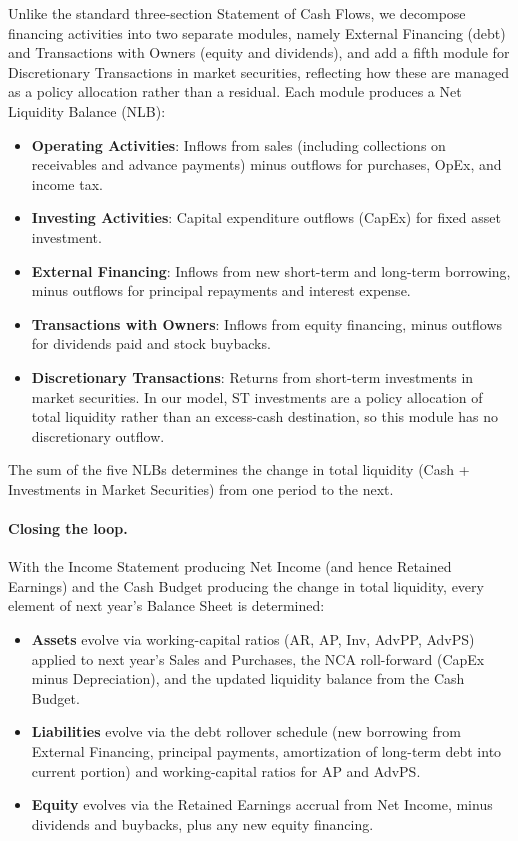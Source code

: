 \documentclass[12pt,a4paper]{article}
\begin{document}
Unlike the standard three-section Statement of Cash Flows, we decompose
financing activities into two separate modules, namely External Financing
(debt) and Transactions with Owners (equity and dividends), and add a
fifth module for Discretionary Transactions in market securities,
reflecting how these are managed as a policy allocation rather than a
residual. Each module produces a Net Liquidity Balance (NLB):

\begin{itemize}
\item \textbf{Operating Activities}: Inflows from sales (including
  collections on receivables and advance payments) minus outflows for
  purchases, OpEx, and income tax.
\item \textbf{Investing Activities}: Capital expenditure outflows
  (CapEx) for fixed asset investment.
\item \textbf{External Financing}: Inflows from new short-term and
  long-term borrowing, minus outflows for principal repayments and
  interest expense.
\item \textbf{Transactions with Owners}: Inflows from equity financing,
  minus outflows for dividends paid and stock buybacks.
\item \textbf{Discretionary Transactions}: Returns from short-term
  investments in market securities. In our model, ST investments are a
  policy allocation of total liquidity rather than an excess-cash
  destination, so this module has no discretionary outflow.
\end{itemize}

The sum of the five NLBs determines the change in total liquidity (Cash
+ Investments in Market Securities) from one period to the next.

\paragraph{Closing the loop.}
With the Income Statement producing Net Income (and hence Retained
Earnings) and the Cash Budget producing the change in total liquidity,
every element of next year's Balance Sheet is determined:

\begin{itemize}
\item \textbf{Assets} evolve via working-capital ratios (AR, AP, Inv,
  AdvPP, AdvPS) applied to next year's Sales and Purchases, the NCA
  roll-forward (CapEx minus Depreciation), and the updated liquidity
  balance from the Cash Budget.
\item \textbf{Liabilities} evolve via the debt rollover schedule (new
  borrowing from External Financing, principal payments, amortization
  of long-term debt into current portion) and working-capital ratios
  for AP and AdvPS.
\item \textbf{Equity} evolves via the Retained Earnings accrual from
  Net Income, minus dividends and buybacks, plus any new equity
  financing.
\end{itemize}
\end{document}
